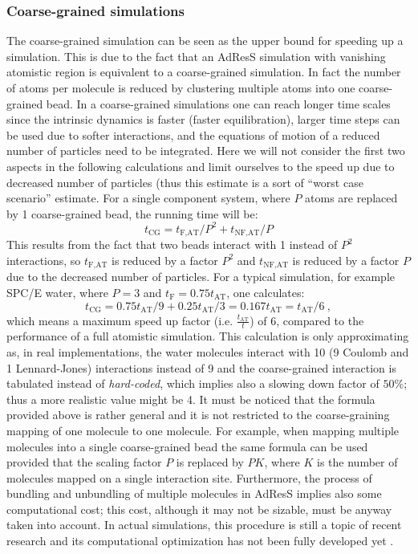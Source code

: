 \documentclass[a4paper,preprint,unsortedaddress]{revtex4-1}
\begin{document}
\subsubsection{Coarse-grained simulations}
The coarse-grained simulation can be seen as the upper bound for speeding up a simulation. This is due to the fact that an AdResS simulation with vanishing atomistic region is equivalent to a coarse-grained simulation. In fact the number of atoms per molecule is reduced by clustering multiple atoms into one coarse-grained bead. 
In a coarse-grained simulations one can reach longer time scales since the intrinsic dynamics is faster (faster equilibration), larger time steps can be used due to softer interactions, and the equations of motion of a reduced number of particles need to be integrated.
Here we will not consider the first two aspects in the following calculations and limit ourselves to the speed up due to decreased number of particles (thus this estimate is a sort of ``worst case scenario'' estimate.
For a single component system, where $P$ atoms are replaced by 1 coarse-grained bead, the running time will be:
\begin{equation}
  t_\text{CG} = t_\text{F,AT}/P^2 + t_\text{NF,AT}/P
\end{equation}
This results from the fact that two beads interact with 1 instead of $P^2$ interactions, so $t_\text{F,AT}$ is reduced by a factor $P^2$ and $t_\text{NF,AT}$ is reduced by a factor $P$ due to the decreased number of particles.
For a typical simulation, for example SPC/E water, where $P=3$ and $t_\text{F}=0.75 t_\text{AT}$, one calculates:
\begin{equation}
  t_\text{CG} = 0.75 t_\text{AT}/9 +0.25 t_\text{AT} /3 = 0.167 t_\text{AT} = t_\text{AT}/6~,
\end{equation}
which means a maximum speed up factor (i.e. $\frac{t_\text{AT}}{t}$) of 6, compared to the performance of a full atomistic simulation.
This calculation is only approximating as, in real implementations, the water molecules interact with 10 (9 Coulomb and 1 Lennard-Jones) interactions instead of 9 and the coarse-grained interaction is tabulated instead of {\it hard-coded}, which implies also a slowing down factor of  $50\%$; thus a more realistic value might be 4.  {It must be noticed that the formula provided above is rather general and it is not restricted to the coarse-graining mapping of one molecule to one molecule. For example, when mapping
multiple molecules into a single coarse-grained bead the same formula can be used provided that the scaling
factor $P$ is replaced by $PK$, where $K$ is the
number of molecules mapped on a single interaction site. Furthermore, the process of bundling and unbundling of multiple molecules in AdResS implies also some computational cost; this cost, although it may not be sizable, must be anyway taken into account. In actual simulations, this procedure is still a topic of recent research and its computational optimization has not been fully developed yet \cite{bundle1,bundle2}.}
\end{document}
